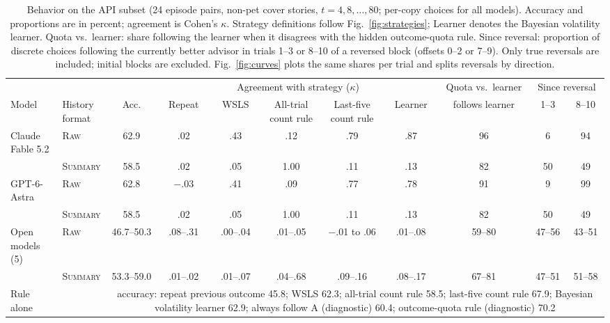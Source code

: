 \documentclass[letterpaper]{article} %
\newcommand{\Raw}{\textsc{Raw}}
\newcommand{\Summary}{\textsc{Summary}}
\begin{document}
\begin{table}[!t]\centering\small
  \setlength{\tabcolsep}{3pt}
  \begin{tabular}{l l c ccccc c cc}
    \toprule
    & & & \multicolumn{5}{c}{Agreement with strategy ($\kappa$)} & Quota vs.\ learner & \multicolumn{2}{c}{Since reversal} \\
    \cmidrule(lr){4-8}\cmidrule(lr){10-11}
    Model & \shortstack{History\\format} & Acc. & Repeat & WSLS & \shortstack{All-trial\\count rule} & \shortstack{Last-five\\count rule} & Learner & follows learner & 1--3 & 8--10 \\
    \midrule
    Claude Fable 5.2 & \Raw{} & 62.9 & .02 & .43 & .12 & .79 & .87 & 96 & 6 & 94 \\
    & \Summary{} & 58.5 & .02 & .05 & 1.00 & .11 & .13 & 82 & 50 & 49 \\
    GPT-6-Astra & \Raw{} & 62.8 & $-$.03 & .41 & .09 & .77 & .78 & 91 & 9 & 99 \\
    & \Summary{} & 58.5 & .02 & .05 & 1.00 & .11 & .13 & 82 & 50 & 49 \\
    \midrule
    Open models (5) & \Raw{} & 46.7--50.3 & .08--.31 & .00--.04 & .01--.05 & $-$.01 to .06 & .01--.08 & 59--80 & 47--56 & 43--51 \\
    & \Summary{} & 53.3--59.0 & .01--.02 & .01--.07 & .04--.68 & .09--.16 & .08--.17 & 67--81 & 47--51 & 51--58 \\
    \midrule
    Rule alone & & \multicolumn{9}{p{0.74\textwidth}}{accuracy: repeat previous outcome 45.8; WSLS 62.3; all-trial count rule 58.5; last-five count rule 67.9; Bayesian volatility learner 62.9; always follow A (diagnostic) 60.4; outcome-quota rule (diagnostic) 70.2} \\
    \bottomrule
  \end{tabular}
  \caption{Behavior on the API subset (24 episode pairs, non-pet cover stories, $t=4,8,\dots,80$; per-copy choices for all models). Accuracy and proportions are in percent; agreement is Cohen's $\kappa$. Strategy definitions follow Fig.~\ref{fig:strategies}; Learner denotes the Bayesian volatility learner. Quota vs.\ learner: share following the learner when it disagrees with the hidden outcome-quota rule. Since reversal: proportion of discrete choices following the currently better advisor in trials 1--3 or 8--10 of a reversed block (offsets 0--2 or 7--9). Only true reversals are included; initial blocks are excluded. Fig.~\ref{fig:curves} plots the same shares per trial and splits reversals by direction.}
  \label{tab:apibeh}
\end{table}
\end{document}
